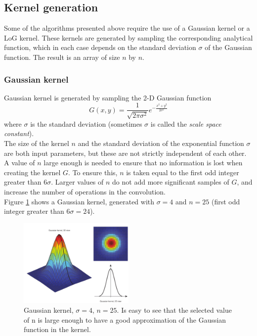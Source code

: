 \documentclass{ipol}
\numberwithin{equation}{section}
\numberwithin{table}{section}
\numberwithin{figure}{section}
\begin{document}

\subsection{Kernel generation}

Some of the algorithms presented above require the use of a Gaussian kernel or a LoG kernel. These 
kernels are generated by sampling the corresponding analytical function, which in each case depends 
on the standard deviation $\sigma$ of the Gaussian function. The result is an array of 
size $n$ by $n$.


\subsubsection{Gaussian kernel}

Gaussian kernel is generated by sampling the 2-D Gaussian function
\begin{equation}
	\label{eq:gaussian_function}
	G(x,y) = \frac{1}{\sqrt{2\pi\sigma^2}}e^{-\frac{x^2+y^2}{2\sigma^2}}
\end{equation}
where $\sigma$ is the standard deviation (sometimes $\sigma$ is called the \textit{scale space constant}).\\

The size of the kernel $n$ and the standard deviation of the exponential function $\sigma$ are both 
input parameters, but these are not strictly independent of each other. 
A value of $n$ large enough is needed to ensure that no information is lost when creating the kernel $G$. To ensure this, $n$ is taken equal to the first odd integer greater than $6\sigma$. Larger values of $n$ do not add more significant samples ​​of $G$, and increase the number of operations in the convolution.\\

Figure \ref{fig:gaussian_kernel} shows a Gaussian kernel, generated with $\sigma = 4$ and $n = 25$ 
(first odd integer greater than $6\sigma=24$).

\begin{figure}
	\centering
	\includegraphics[width=0.5\textwidth]{kernel_gaussian.pdf}
	\caption{Gaussian kernel, $\sigma=4$, $n=25$. Is easy to see that the selected value of n is 
large enough to have a good approximation of the Gaussian function in the kernel.}
	\label{fig:gaussian_kernel}
\end{figure}
\end{document}
